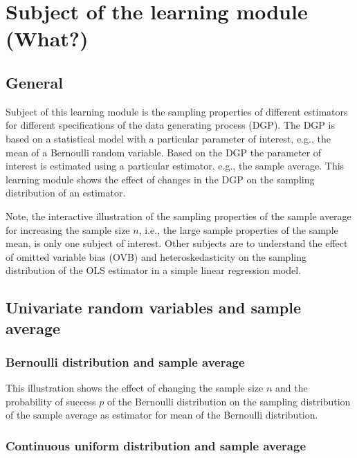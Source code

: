 \documentclass{article}
\begin{document}
\section{Subject of the learning module (What?)}

\subsection{General}

Subject of this learning module is the sampling properties of different estimators for different specifications of the data generating process (DGP). 
%
The DGP is based on a statistical model with a particular parameter of interest, e.g., the mean of a Bernoulli random variable. 
%
Based on the DGP the parameter of interest is estimated using a particular estimator, e.g., the sample average. 
%
This learning module shows the effect of changes in the DGP on the sampling distribution of an estimator.  

Note, the interactive illustration of the sampling properties of the sample average for increasing the sample size $n$, i.e., the large sample properties of the sample mean, is only one subject of interest. 
%
Other subjects are to understand the effect of omitted variable bias (OVB) and heteroskedasticity on the sampling distribution of the OLS estimator in a simple linear regression model.

\subsection{Univariate random variables and sample average}

\subsubsection{Bernoulli distribution and sample average}


This illustration shows the effect of changing the sample size $n$ and the probability of success $p$ of the Bernoulli distribution on the sampling distribution of the sample average as estimator for mean of the Bernoulli distribution.

\subsubsection{Continuous uniform distribution and sample average}

\end{document}
